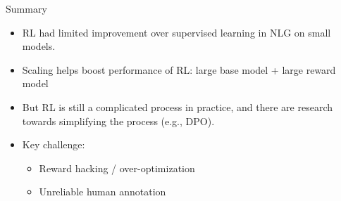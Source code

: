 \documentclass[usenames,dvipsnames,notes,11pt,aspectratio=169,hyperref={colorlinks=true, linkcolor=blue}]{beamer}
\begin{document}
\begin{frame}
    {Summary}
    \begin{itemize}
        \itemsep1em
        \item RL had limited improvement over supervised learning in NLG on small models.
        \item Scaling helps boost performance of RL: large base model + large reward model 
        \item But RL is still a complicated process in practice, and there are research towards simplifying the process (e.g., DPO).
        \item Key challenge:
            \begin{itemize}
                \item Reward hacking / over-optimization
                \item Unreliable human annotation
            \end{itemize}
    \end{itemize}
\end{frame}
\end{document}
